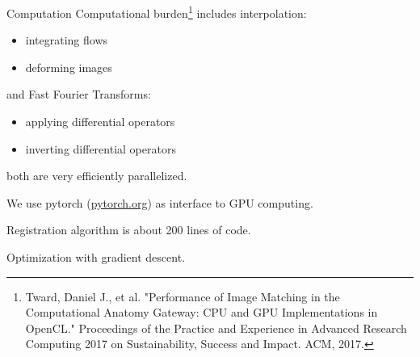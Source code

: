 \documentclass{beamer}
\begin{document}
\begin{frame}

\end{frame}



\begin{frame}{Computation}%
\setcounter{footnote}{6}%
Computational burden\footnote{Tward, Daniel J., et al. "Performance of Image Matching in the Computational Anatomy Gateway: CPU and GPU Implementations in OpenCL." Proceedings of the Practice and Experience in Advanced Research Computing 2017 on Sustainability, Success and Impact. ACM, 2017.} includes interpolation:
\begin{itemize}
\item integrating flows
\item deforming images
\end{itemize}
and Fast Fourier Transforms:
\begin{itemize}
\item applying differential operators
\item inverting differential operators
\end{itemize}
both are very efficiently parallelized.

\vspace{1em}

We use pytorch (\url{pytorch.org}) as interface to GPU computing.

\vspace{1em}

Registration algorithm is about 200 lines of code.

\vspace{1em}

Optimization with gradient descent.

\end{frame}
\end{document}
